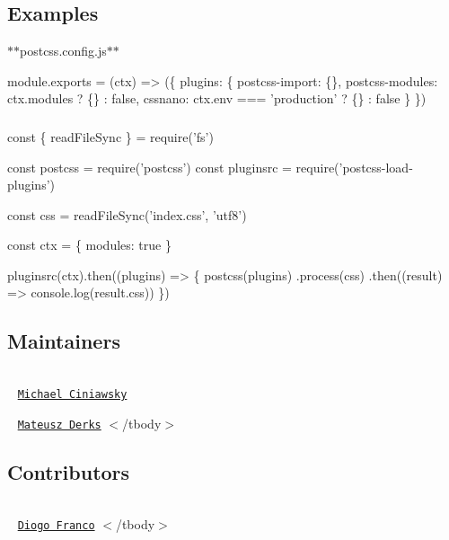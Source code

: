 \subsection*{Examples}

$\ast$$\ast${\ttfamily postcss.\+config.\+js}$\ast$$\ast$


\begin{DoxyCode}
module.exports = (ctx) => (\{
  plugins: \{
    postcss-import: \{\},
    postcss-modules: ctx.modules ? \{\} : false,
    cssnano: ctx.env === 'production' ? \{\} : false
  \}
\})
\end{DoxyCode}


\subsubsection*{}


\begin{DoxyCode}
const \{ readFileSync \} = require('fs')

const postcss = require('postcss')
const pluginsrc = require('postcss-load-plugins')

const css = readFileSync('index.css', 'utf8')

const ctx = \{ modules: true \}

pluginsrc(ctx).then((plugins) => \{
  postcss(plugins)
    .process(css)
    .then((result) => console.log(result.css))
\})
\end{DoxyCode}


\subsection*{Maintainers}

\tabulinesep=1mm
\begin{longtabu} spread 0pt [c]{*{0}{|X[-1]}|}
\hline
\end{longtabu}


 ~\newline
 \href{https://github.com/michael-ciniawsky}{\tt Michael Ciniawsky}  

 ~\newline
 \href{https://github.com/ertrzyiks}{\tt Mateusz Derks}   $<$/tbody$>$ 

\subsection*{Contributors}

\tabulinesep=1mm
\begin{longtabu} spread 0pt [c]{*{0}{|X[-1]}|}
\hline
\end{longtabu}


 ~\newline
 \href{https://github.com/Kovensky}{\tt Diogo Franco}   $<$/tbody$>$ 